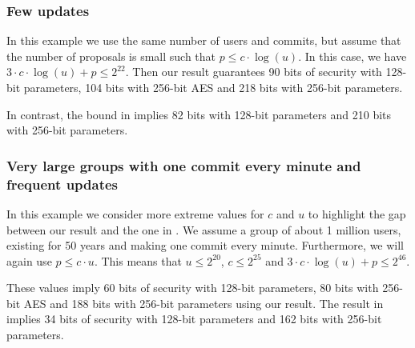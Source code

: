 \subsubsection{Few updates}

In this example we use the same number of users and commits, but assume that the number of proposals is small such that $p \le c \cdot \log(u)$. In this case, we have $3 \cdot c \cdot \log(u) + p \le 2^{22}$. Then our result guarantees 90 bits of security with 128-bit parameters, 104 bits with 256-bit AES and 218 bits with 256-bit parameters.

In contrast, the bound in \cite{ttkem} implies 82 bits with 128-bit parameters and 210 bits with 256-bit parameters.

\subsubsection{Very large groups with one commit every minute and frequent updates} In this example we consider more extreme values for $c$ and $u$ to highlight the gap between our result and the one in \cite{ttkem}. We assume a group of about 1 million users, existing for 50 years and making one commit every minute. Furthermore, we will again use $p \le c \cdot u$. This means that $u \le 2^{20}$, $c \le 2^{25}$ and $3 \cdot c \cdot \log(u) + p \le 2^{46}$.

These values imply 60 bits of security with 128-bit parameters, 80 bits with 256-bit AES and 188 bits with 256-bit parameters using our result. The result in \cite{ttkem} implies 34 bits of security with 128-bit parameters and 162 bits with 256-bit parameters.
